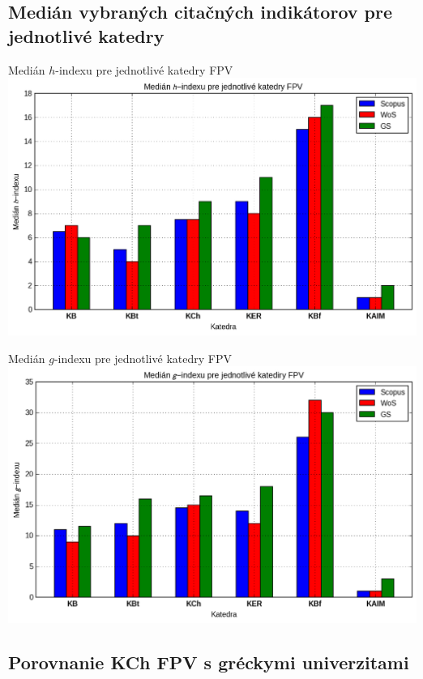 \documentclass{beamer}
\begin{document}
\subsection{Medián vybraných citačných indikátorov pre jednotlivé katedry}
%
%
\begin{frame}{Medián $h$-indexu pre jednotlivé katedry FPV}
  \includegraphics[scale=0.5]{plot-results-data-h_index.png}
\end{frame}

%
%
\begin{frame}{Medián $g$-indexu pre jednotlivé katedry FPV}
  \includegraphics[scale=0.499]{plot-results-data-g_index.png}
\end{frame}

\subsection{Porovnanie KCh FPV s gréckymi univerzitami}
\end{document}

